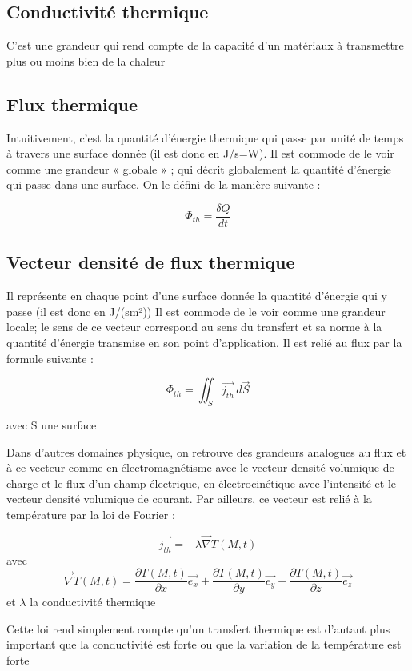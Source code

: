 \documentclass[10pt,a4paper]{report}
\begin{document}
\subsection{Conductivité thermique}
C’est une grandeur qui rend compte de la capacité d’un matériaux à transmettre plus ou moins bien de la chaleur
\subsection{Flux thermique}
Intuitivement, c’est la quantité d’énergie thermique qui passe par unité de temps à travers une surface donnée (il est donc en J/s=W). Il est commode de le voir comme une grandeur « globale » ; qui décrit globalement la quantité d’énergie qui passe dans une surface. On le défini de la manière suivante :
\begin{center}
\begin{equation}
\Phi_{th}=\frac{\delta Q}{dt}
\end{equation}
\end{center}
\subsection{Vecteur densité de flux thermique}
Il représente en chaque point d'une surface donnée la quantité d’énergie qui y passe (il est donc en J/(sm²)) Il est commode de le voir comme une grandeur locale; le sens de ce vecteur correspond au sens du transfert et sa norme à la quantité d'énergie transmise en son point d'application. Il est relié au flux par la formule suivante :
\begin{center}
\begin{equation}
\Phi_{th}=\iint_{S} \vec{j_{th}} \,d\vec{S}
\end{equation}
\end{center}
\begin{center}
avec S une surface
\end{center}
Dans d’autres domaines physique, on retrouve des grandeurs analogues au flux et à ce vecteur comme en électromagnétisme avec le vecteur densité volumique de charge et le flux d’un champ électrique, en électrocinétique avec l’intensité et le vecteur densité volumique de courant.
\newline
Par ailleurs, ce vecteur est relié à la température par la loi de Fourier :
\begin{center}
\begin{equation}
\vec{j_{th}}=-\lambda\vec{\nabla}T(M,t)
\end{equation}
avec
\begin{equation}
 \vec{\nabla}T(M,t)=\frac{\partial T(M,t)}{\partial x}\vec{e_{x}}+\frac{\partial T(M,t)}{\partial y}\vec{e_{y}}+\frac{\partial T(M,t)}{\partial z}\vec{e_{z}}
\end{equation}
et $\lambda$ la conductivité thermique
\end{center}
Cette loi rend simplement compte qu'un transfert thermique est d’autant plus important que la conductivité est forte ou que la variation de la température est forte
\end{document}

